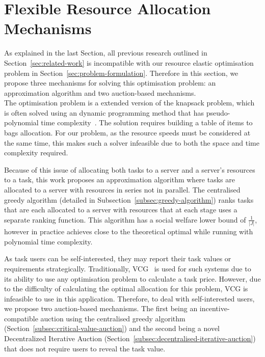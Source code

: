 \section{Flexible Resource Allocation Mechanisms}
\label{sec:flexible-resource-allocation-mechanisms}
As explained in the last Section, all previous research outlined in Section~\ref{sec:related-work} is incompatible
with our resource elastic optimisation problem in Section~\ref{sec:problem-formulation}. Therefore in this
section, we propose three mechanisms for solving this optimisation problem: an approximation algorithm and two
auction-based mechanisms. \\
The optimisation problem is a extended version of the knapsack problem, which is often solved using an dynamic
programming method that has pseudo-polynomial time complexity~\cite{toth1980dynamic}. The solution requires building
a table of items to bags allocation. For our problem, as the resource speeds must be considered at the same time, this
makes such a solver infeasible due to both the space and time complexity required.

Because of this issue of allocating both tasks to a server and a server's resources to a task, this work proposes an
approximation algorithm where tasks are allocated to a server with resources in series not in parallel. The centralised
greedy algorithm (detailed in Subsection~\ref{subsec:greedy-algorithm}) ranks tasks that are each allocated to a server
with resources that at each stage uses a separate ranking function. This algorithm has a social welfare lower bound
of $\frac{1}{\left|J\right|}$, however in practice achieves close to the theoretical optimal while running with
polynomial time complexity.

As task users can be self-interested, they may report their task values or requirements strategically. Traditionally,
VCG~\cite{vickrey,Clarke,groves} is used for such systems due to its ability to use any optimisation problem to
calculate a task price. However, due to the difficulty of calculating the optimal allocation for this problem, VCG is
infeasible to use in this application. Therefore, to deal with self-interested users, we propose two auction-based
mechanisms. The first being an incentive-compatible auction using the centralised greedy algorithm
(Section~\ref{subsec:critical-value-auction}) and the second being a novel Decentralized Iterative
Auction (Section~\ref{subsec:decentralised-iterative-auction}) that does not require users to reveal the task value.

